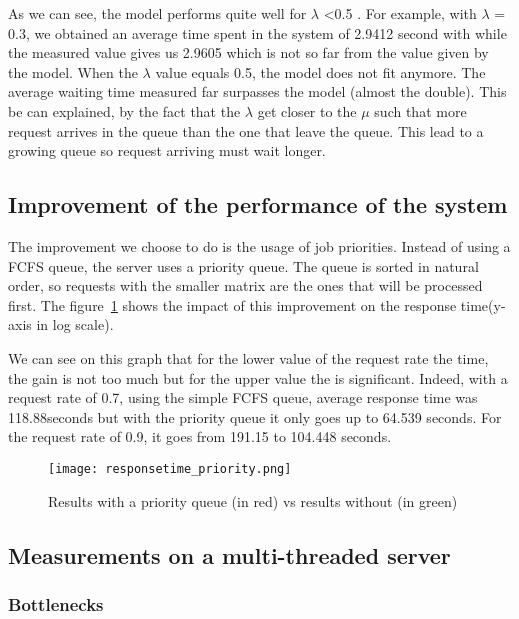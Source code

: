 As we can see, the model performs quite well for $\lambda$ <0.5 . For example, with $\lambda$ = 0.3,
we obtained an average time spent in the system of 2.9412 second with while the measured value gives us
2.9605 which is not so far from the value given by the model. When the $\lambda$ value equals 0.5, the
model does not fit anymore. The average waiting time measured far surpasses the model (almost the
double). This be can explained, by the fact that the $\lambda$ get closer to the $\mu$ such that more
request arrives in the queue than the one that leave the queue. This lead to a growing queue so request
arriving must wait longer.


\subsection{Improvement of the performance of the system}
\label{sub:Improvement of the performance of the system}
The improvement we choose to do is the usage of job priorities. Instead of using a FCFS queue,
the server uses a priority queue. The queue is sorted in natural order, so requests with the smaller matrix
are the ones that will be processed first. The figure~\ref{fig:priorityqueue} shows the impact of this
improvement on the response time(y-axis in log scale).

We can see on this graph that for the lower value of the request rate the time, the gain is not too much but
for the upper value the is significant. Indeed, with a request rate of 0.7, using the simple FCFS queue, average
response time was 118.88seconds but with the priority queue it only goes up to 64.539 seconds. For the
request rate of 0.9, it goes from 191.15 to 104.448 seconds.

\begin{figure}[!ht]
    \centering
    \texttt{[image: responsetime\_priority.png]}
    \caption{Results with a priority queue (in red) vs results without (in green)}
    \label{fig:priorityqueue}
\end{figure}

\subsection{Measurements on a multi-threaded server}
\label{sub:Measurements on a multi-threaded server}

\subsubsection{Bottlenecks}
\label{subs:Bottlenecks}


